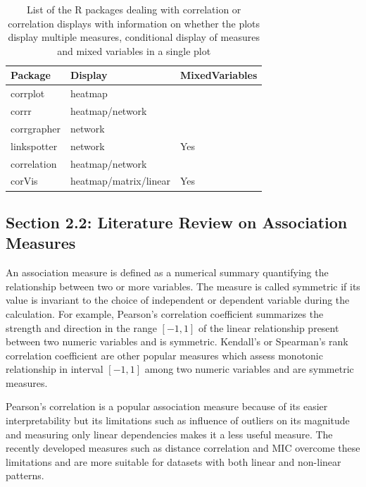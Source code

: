 \begin{Schunk}
\begin{table}

\caption{\label{tab:corrdisplay-packages}List of the R packages dealing with correlation or correlation displays with information on whether the plots display multiple measures, conditional display of measures and mixed variables in a single plot}
\centering
\begin{tabular}[t]{lll}
\toprule
Package & Display & MixedVariables\\
\midrule
corrplot & heatmap & \\
corrr & heatmap/network & \\
corrgrapher & network & \\
linkspotter & network & Yes\\
correlation & heatmap/network & \\
\addlinespace
corVis & heatmap/matrix/linear & Yes\\
\bottomrule
\end{tabular}
\end{table}

\end{Schunk}

\hypertarget{section-2.2-literature-review-on-association-measures}{%
\subsection{Section 2.2: Literature Review on Association
Measures}\label{section-2.2-literature-review-on-association-measures}}

An association measure is defined as a numerical summary quantifying the
relationship between two or more variables. The measure is called
symmetric if its value is invariant to the choice of independent or
dependent variable during the calculation. For example, Pearson's
correlation coefficient summarizes the strength and direction in the
range \([-1,1]\) of the linear relationship present between two numeric
variables and is symmetric. Kendall's or Spearman's rank correlation
coefficient are other popular measures which assess monotonic
relationship in interval \([-1,1]\) among two numeric variables and are
symmetric measures.

Pearson's correlation is a popular association measure because of its
easier interpretability but its limitations such as influence of
outliers on its magnitude and measuring only linear dependencies makes
it a less useful measure. The recently developed measures such as
distance correlation \citep{szekely2007measuring} and MIC
\citep{reshef2011detecting} overcome these limitations and are more
suitable for datasets with both linear and non-linear patterns.

